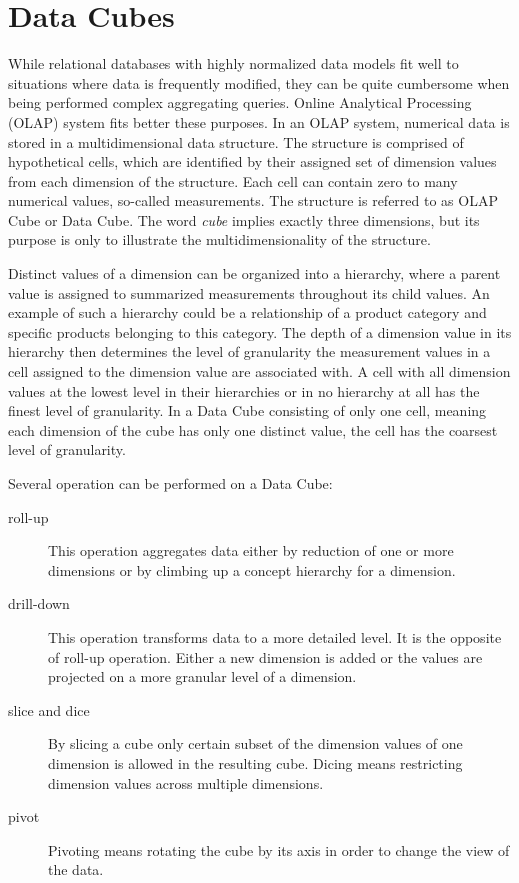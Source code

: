 \chapter{Data Cubes}

While relational databases with highly normalized data models fit well to situations where data is frequently modified, they can be quite cumbersome when being performed complex aggregating queries. Online Analytical Processing (OLAP) system fits better these purposes. In an OLAP system, numerical data is stored in a multidimensional data structure. The structure is comprised of hypothetical cells, which are identified by their assigned set of dimension values from each dimension of the structure. Each cell can contain zero to many numerical values, so-called measurements. The structure is referred to as OLAP Cube or Data Cube. The word \textit{cube} implies exactly three dimensions, but its purpose is only to illustrate the multidimensionality of the structure.

Distinct values of a dimension can be organized into a hierarchy, where a parent value is assigned to summarized measurements throughout its child values. An example of such a hierarchy could be a relationship of a product category and specific products belonging to this category. The depth of a dimension value in its hierarchy then determines the level of granularity the measurement values in a cell assigned to the dimension value are associated with. A cell with all dimension values at the lowest level in their hierarchies or in no hierarchy at all has the finest level of granularity. In a Data Cube consisting of only one cell, meaning each dimension of the cube has only one distinct value, the cell has the coarsest level of granularity.

Several operation can be performed on a Data Cube:

\begin{description}
    \item[roll-up] This operation aggregates data either by reduction of one or more dimensions or by climbing up a concept hierarchy for a dimension.
    \item[drill-down] This operation transforms data to a more detailed level. It is the opposite of roll-up operation. Either a new dimension is added or the values are projected on a more granular level of a dimension.
    \item[slice and dice] By slicing a cube only certain subset of the dimension values of one dimension is allowed in the resulting cube. Dicing means restricting dimension values across multiple dimensions.
    \item[pivot] Pivoting means rotating the cube by its axis in order to change the view of the data.
\end{description}

